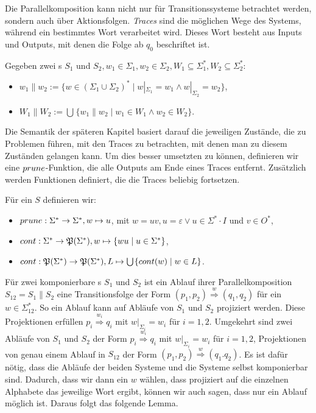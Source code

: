 Die Parallelkomposition kann nicht nur für Transitionssysteme betrachtet
werden, sondern auch über Aktionsfolgen. \emph{Traces} sind die möglichen Wege des
Systems, während ein bestimmtes Wort verarbeitet wird. Dieses Wort besteht aus
Inputs und Outputs, mit denen die Folge ab $q_0$ beschriftet ist.

\begin{Def}
  Gegeben zwei \EIO{}s $S_1$ und $S_2,
  w_1\in\Sigma _1, w_2\in\Sigma _2, W_1\subseteq\Sigma _1^*, W_2\subseteq\Sigma
  _2^*$:
  \begin{itemize}
    \item $w_1\| w_2:=\{w\in (\Sigma _1\cup\Sigma _2)^*\mid w|_{\Sigma _1}=w_1\wedge
      w|_{\Sigma _2}=w_2\}$,
    \item $W_1\| W_2:=\bigcup\hspace{1pt}\{w_1\| w_2\mid w_1\in W_1\wedge w_2\in W_2\}$.
  \end{itemize}
\end{Def}

Die Semantik der späteren Kapitel basiert darauf die jeweiligen Zustände, die
zu Problemen führen, mit den Traces zu betrachten, mit denen man zu diesem
Zuständen gelangen kann. Um dies besser umsetzten zu
können, definieren wir eine $prune{}$-Funktion, die alle Outputs am Ende
eines Traces entfernt. Zusätzlich werden Funktionen definiert, die
die Traces beliebig fortsetzen.

\begin{Def}
  Für ein \EIO{} $S$ definieren wir:
  \begin{itemize}
    \item $prune{}:\Sigma ^*\rightarrow\Sigma ^*, w\mapsto u$, mit $w=uv,
      u=\varepsilon\vee u\in\Sigma ^*\cdot I$ und $v\in O^*$,
    \item $cont{}:\Sigma ^*\rightarrow\mathfrak{P}(\Sigma ^*),
      w\mapsto\{wu\mid u\in\Sigma ^*\}$,
    \item $cont{}:\mathfrak{P}(\Sigma ^*)\rightarrow\mathfrak{P}(\Sigma ^*),
      L\mapsto\bigcup\hspace{1pt}\{cont{}(w)\mid w\in L\}$.
  \end{itemize}
\end{Def}

Für zwei komponierbare \EIO{}s $S_1$ und $S_2$ ist ein Ablauf ihrer
Parallelkomposition $S_{12}=S_1\| S_2$ eine Transitionsfolge der Form $(p_1,p_2)
\overset{w}{\Rightarrow} (q_1,q_2)$ für ein $w\in\Sigma_{12}^*$. So ein Ablauf
kann auf Abläufe von $S_1$ und $S_2$ projiziert werden. Diese Projektionen
erfüllen $p_i \overset{w_i}{\Rightarrow} q_i$ mit $w|_{\Sigma
_i}=w_i$ für $i=1,2$. Umgekehrt sind zwei Abläufe von $S_1$ und $S_2$ der Form
$p_i \overset{w_i}{\Rightarrow} q_i$ mit $w| _{\Sigma _i}= w_i$ für $i=1,2$,
Projektionen von genau einem Ablauf in $S_{12}$ der Form $(p_1,p_2)
\overset{w}{\Rightarrow} (q_1.q_2)$. Es ist dafür nötig, dass die Abläufe der
beiden Systeme und die Systeme selbst komponierbar sind. Dadurch, dass wir dann
ein $w$ wählen, dass projiziert auf die einzelnen Alphabete das jeweilige Wort
ergibt, können wir auch sagen, dass nur ein Ablauf möglich ist. Daraus folgt
das folgende Lemma.


